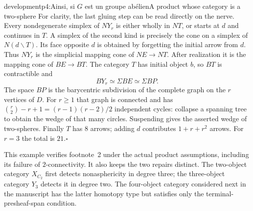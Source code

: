 \begin{dcomment}{development}{p4:Ainsi, si $G$ est un groupe abélien}{A product whose category is a two-sphere}
For clarity, the last gluing step can be read directly on the nerve. Every nondegenerate simplex of $NY_r$ is either wholly in $NT$, or starts at $d$ and continues in $T$. A simplex of the second kind is precisely the cone on a simplex of $N(d\backslash T)$. Its face opposite $d$ is obtained by forgetting the initial arrow from $d$. Thus $NY_r$ is the simplicial mapping cone of $NE\to NT$. After realization it is the mapping cone of $BE\to BT$. The category $T$ has initial object $b$, so $BT$ is contractible and
\[
 BY_r\simeq\Sigma BE\simeq\Sigma BP.
\]
The space $BP$ is the barycentric subdivision of the complete graph on the $r$ vertices of $D$. For $r\ge1$ that graph is connected and has $\binom r2-r+1=(r-1)(r-2)/2$ independent cycles: collapse a spanning tree to obtain the wedge of that many circles. Suspending gives the asserted wedge of two-spheres. Finally $T$ has $8$ arrows; adding $d$ contributes $1+r+r^2$ arrows. For $r=3$ the total is $21$.\hfill$\square$

This example verifies footnote~2 under the actual product assumptions, including its failure of $2$-connectivity. It also keeps the two repairs distinct. The two-object category $X_{C_2}$ first detects nonasphericity in degree three; the three-object category $Y_3$ detects it in degree two. The four-object category considered next in the manuscript has the latter homotopy type but satisfies only the terminal-presheaf-span condition.
\end{dcomment}

